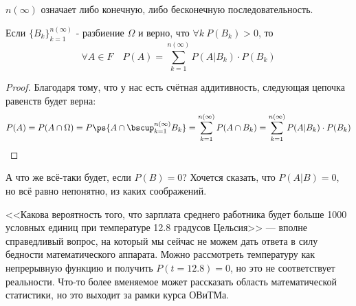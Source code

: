 \begin{note}
	$n(\infty)$ означает либо конечную, либо бесконечную последовательность.
\end{note}

\begin{theorem}
	Если $\{B_k\}_{k = 1}^{n(\infty)}$ - разбиение $\Omega$ и верно, что $\forall k\ P(B_k) > 0$, то
	\[
		\forall A \in F \quad P(A) = \sum_{k = 1}^{n(\infty)} P(A|B_k) \cdot P(B_k)
	\]
\end{theorem}

\begin{proof}
	Благодаря тому, что у нас есть счётная аддитивность, следующая цепочка равенств будет верна:
	\[
		P(A) = P(A \cap \Omega) = P\ps{A \cap \bscup_{k = 1}^{n(\infty)} B_k} = \sum_{k = 1}^{n(\infty)} P(A \cap B_k) = \sum_{k = 1}^{n(\infty)} P(A|B_k) \cdot P(B_k)
	\]
\end{proof}

\begin{note}
	А что же всё-таки будет, если $P(B) = 0$? Хочется сказать, что $P(A|B) = 0$, но всё равно непонятно, из каких соображений.
\end{note}

\begin{example}
	<<Какова вероятность того, что зарплата среднего работника будет больше 1000 условных единиц при температуре 12.8 градусов Цельсия>> --- вполне справедливый вопрос, на который мы сейчас не можем дать ответа в силу бедности математического аппарата. Можно рассмотреть температуру как непрерывную функцию и получить $P(t = 12.8) = 0$, но это не соответствует реальности. Что-то более вменяемое может рассказать область математической статистики, но это выходит за рамки курса ОВиТМа.
\end{example}